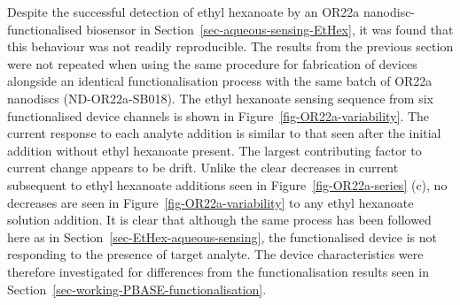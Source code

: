 \documentclass[
  a4paper,
]{scrbook}
\begin{document}
Despite the successful detection of ethyl hexanoate by an OR22a
nanodisc-functionalised biosensor in
Section~\ref{sec-aqueous-sensing-EtHex}, it was found that this
behaviour was not readily reproducible. The results from the previous
section were not repeated when using the same procedure for fabrication
of devices alongside an identical functionalisation process with the
same batch of OR22a nanodiscs (ND-OR22a-SB018). The ethyl hexanoate
sensing sequence from six functionalised device channels is shown in
Figure~\ref{fig-OR22a-variability}. The current response to each analyte
addition is similar to that seen after the initial addition without
ethyl hexanoate present. The largest contributing factor to current
change appears to be drift. Unlike the clear decreases in current
subsequent to ethyl hexanoate additions seen in
Figure~\ref{fig-OR22a-series} (c), no decreases are seen in
Figure~\ref{fig-OR22a-variability} to any ethyl hexanoate solution
addition. It is clear that although the same process has been followed
here as in Section~\ref{sec-EtHex-aqueous-sensing}, the functionalised
device is not responding to the presence of target analyte. The device
characteristics were therefore investigated for differences from the
functionalisation results seen in
Section~\ref{sec-working-PBASE-functionalisation}.
\end{document}
